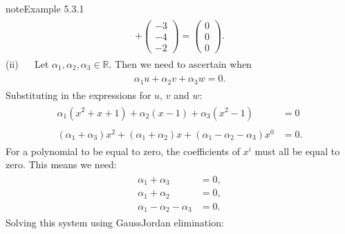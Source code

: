 \documentclass[letterpaper,10pt,english]{jupyterBook}
\begin{document}
\begin{sphinxadmonition}{note}{Example 5.3.1}
\begin{equation*}
\begin{split}
\begin{align*}
    + \begin{pmatrix} -3 \\ -4 \\ -2 \end{pmatrix} =
    \begin{pmatrix} 0 \\ 0 \\ 0 \end{pmatrix}.
\end{align*} \end{split}
\end{equation*}
\sphinxAtStartPar
(ii)   Let \(\alpha_1, \alpha_2, \alpha_3 \in \mathbb{R}\). Then we need to ascertain when
\begin{equation*}
\begin{split} \begin{align*}
    \alpha_1 u + \alpha_2 v + \alpha_3 w = 0.
\end{align*} \end{split}
\end{equation*}
\sphinxAtStartPar
Substituting in the expressions for \(u\), \(v\) and \(w\):
\begin{equation*}
\begin{split} \begin{align*}
    \alpha_1 (x^2 + x + 1) + \alpha_2 (x - 1) + \alpha_3 (x^2 - 1) &= 0 \\ \\
    (\alpha_1 + \alpha_3)x^2 + (\alpha_1 + \alpha_2)x + (\alpha_1 - \alpha_2 - \alpha_3)x^0 &= 0.
\end{align*} \end{split}
\end{equation*}
\sphinxAtStartPar
For a polynomial to be equal to zero, the coefficients of \(x^i\) must all be equal to zero. This means we need:
\begin{equation*}
\begin{split} \begin{align*}
    \alpha_1 + \alpha_3 &= 0, \\
    \alpha_1 + \alpha_2 &= 0, \\
    \alpha_1 - \alpha_2 - \alpha_3 &= 0.
\end{align*} \end{split}
\end{equation*}
\sphinxAtStartPar
Solving this system using Gauss\sphinxhyphen{}Jordan elimination:
\begin{equation*}
\begin{split} \begin{align*}

\end{align*}
\end{split}
\end{equation*}
\end{sphinxadmonition}
\end{document}

